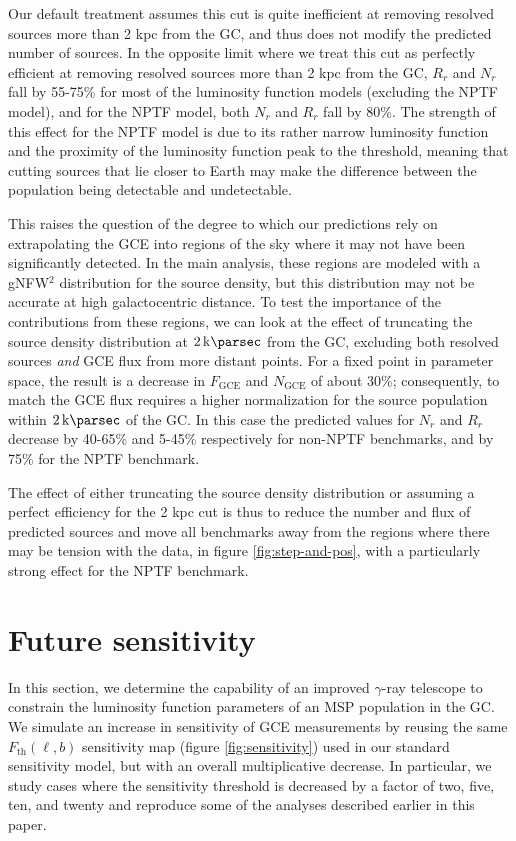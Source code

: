 \documentclass[letter,11pt]{article}
\begin{document}
Our default treatment assumes this cut is quite inefficient at removing resolved sources more than 2 kpc from the GC, and thus does not modify the predicted number of sources. In the opposite limit where we treat this cut as perfectly efficient at removing resolved sources more than 2 kpc from the GC, $R_r$ and $N_r$ fall by 55-75\% for most of the luminosity function models (excluding the NPTF model), and for the NPTF model, both $N_r$ and $R_r$ fall by 80\%. The strength of this effect for the NPTF model is due to its rather narrow luminosity function and the proximity of the luminosity function peak to the threshold, meaning that cutting sources that lie closer to Earth may make the difference between the population being detectable and undetectable.

This raises the question of the degree to which our predictions rely on extrapolating the GCE into regions of the sky where it may not have been significantly detected. In the main analysis, these regions are modeled with a gNFW$^2$ distribution for the source density, but this distribution may not be accurate at high galactocentric distance. To test the importance of the contributions from these regions, we can look at the effect of truncating the source density distribution at $\SI{2}{\kilo\parsec}$ from the GC, excluding both resolved sources {\it and} GCE flux from more distant points. For a fixed point in parameter space, the result is a decrease in $F_\text{GCE}$ and $N_\text{GCE}$ of about 30\%; consequently, to match the GCE flux requires a higher normalization for the source population within $\SI{2}{\kilo\parsec}$ of the GC. In this case the predicted values for $N_r$ and $R_r$ decrease by 40-65\% and 5-45\% respectively for non-NPTF benchmarks, and by 75\% for the NPTF benchmark.

The effect of either truncating the source density distribution or assuming a perfect efficiency for the 2 kpc cut is thus to reduce the number and flux of predicted sources and move all benchmarks away from the regions where there may be tension with the data, in figure \ref{fig:step-and-pos}, with a particularly strong effect for the NPTF benchmark.



\section{Future sensitivity}
\label{sec:future-sensitivity}
In this section, we determine the capability of an improved $\gamma$-ray telescope to constrain the luminosity function parameters of an MSP population in the GC. We simulate an increase in sensitivity of GCE measurements by reusing the same $F_\text{th}(\ell, b)$ sensitivity map (figure \ref{fig:sensitivity}) used in our standard sensitivity model, but with an overall multiplicative decrease. In particular, we study cases where the sensitivity threshold is decreased by a factor of two, five, ten, and twenty and reproduce some of the analyses described earlier in this paper.
\end{document}
